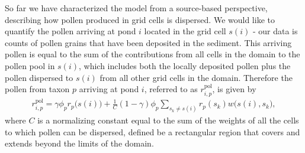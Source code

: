 \documentclass[12pt]{article}
\begin{document}
So far we have characterized the model from a source-based
perspective, describing how pollen produced in grid cells is
dispersed. We would like to quantify the pollen arriving at pond $i$
located in the grid cell $s(i)$ - our data is counts of pollen grains
that have been deposited in the sediment. This arriving pollen is
equal to the sum of the contributions from all cells in the domain to
the pollen pool in $s(i)$, which includes both the locally deposited
pollen plus the pollen dispersed to $s(i)$ from all other grid cells
in the domain. Therefore the pollen from taxon $p$ arriving at pond
$i$, referred to as $r_{i,p}^{\text{pol}}$, is given by
\begin{align}
r_{i,p}^{\text{pol}} = \gamma \phi_p r_p\bigl(s(i)\bigr) + \frac{1}{C} (1-\gamma) \phi_p \sum_{s_k \neq s(i) } r_p(s_k) w\bigl(s(i), s_k\bigr),
\label{eq:arriving}
\end{align}
where $C$ is a normalizing constant equal to the sum of the weights of
all the cells to which pollen can be dispersed, defined be a
rectangular region that covers and extends beyond the limits of the
domain.
\end{document}
